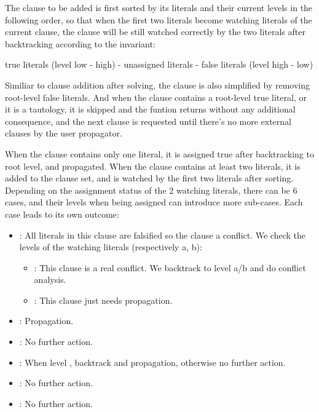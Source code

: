 
The clause to be added is first sorted by its literals and their current levels in the following order, so that when the first two literals become watching literals of the current clause, the clause will be still watched correctly by the two literals after backtracking according to the invariant:

true literals (level low - high) - unassigned literals - false literals (level high - low)

Similiar to clause addition after solving, the clause is also simplified by removing root-level false literals. And when the clause contains a root-level true literal, or it is a tautology, it is skipped and the funtion returns without any additional consequence, and the next clause is requested until there's no more external clauses by the user propagator.

When the clause contains only one literal, it is assigned true after backtracking to root level, and propagated. When the clause contains at least two literals, it is added to the clause set, and is watched by the first two literals after sorting. Depending on the assignment status of the 2 watching literals, there can be 6 cases, and their levels when being assigned can introduce more sub-cases. Each case leads to its own outcome:

\begin{itemize}
  \item {}: All literals in this clause are falsified so the clause a conflict. We check the levels of the watching literals (respectively a, b):
  \begin{itemize}
    \item {}: This clause is a real conflict. We backtrack to level a/b and do conflict analysis.
    \item {}: This clause just needs propagation.
  \end{itemize}
  \item {}: Propagation.
  \item {}: No further action.
  \item {}: When level , backtrack and propagation, otherwise no further action.
  \item {}: No further action.
  \item {}: No further action.
\end{itemize}

